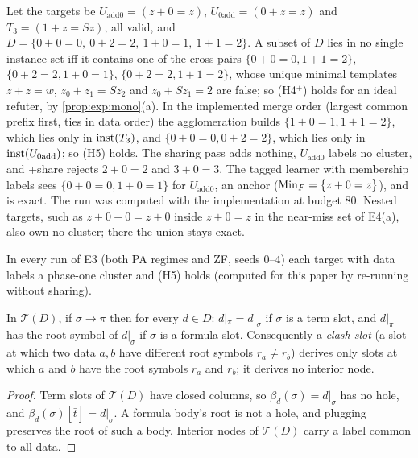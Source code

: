 \begin{example}\label{ex:exp:share}
Let the targets be $U_{\mathrm{add0}}=(z+0=z)$, $U_{\mathrm{0add}}=(0+z=z)$ and $T_3=(1+z=Sz)$, all valid, and $D=\{0+0=0,\ 0+2=2,\ 1+0=1,\ 1+1=2\}$. A subset of $D$ lies in no single instance set iff it contains one of the cross pairs $\{0+0=0,1+1=2\}$, $\{0+2=2,1+0=1\}$, $\{0+2=2,1+1=2\}$, whose unique minimal templates $z+z=w$, $z_0+z_1=Sz_2$ and $z_0+Sz_1=2$ are false; so (H4$^+$) holds for an ideal refuter, by \cref{prop:exp:mono}(a). In the implemented merge order (largest common prefix first, ties in data order) the agglomeration builds $\{1+0=1,1+1=2\}$, which lies only in $\mathrm{inst}(T_3)$, and $\{0+0=0,0+2=2\}$, which lies only in $\mathrm{inst}(U_{\mathrm{0add}})$; so (H5) holds. The sharing pass adds nothing, $U_{\mathrm{add0}}$ labels no cluster, and \DTRC{}+share rejects $2+0=2$ and $3+0=3$. The tagged learner with membership labels sees $\{0+0=0,1+0=1\}$ for $U_{\mathrm{add0}}$, an anchor ($\mathrm{Min}_F=\{z+0=z\}$), and is exact. The run was computed with the implementation at budget $80$. Nested targets, such as $z+0+0=z+0$ inside $z+0=z$ in the near-miss set of E4(a), also own no cluster; there the union stays exact.
\end{example}

In every run of E3 (both PA regimes and ZF, seeds $0$--$4$) each target with data labels a phase-one cluster and (H5) holds (computed for this paper by re-running \DTRC{} without sharing).

\begin{lemma}\label{lem:exp:heads}
In $\mathcal T(D)$, if $\sigma\to\pi$ then for every $d\in D$: $d|_\pi=d|_\sigma$ if $\sigma$ is a term slot, and $d|_\pi$ has the root symbol of $d|_\sigma$ if $\sigma$ is a formula slot. Consequently a \emph{clash slot} (a slot at which two data $a,b$ have different root symbols $r_a\neq r_b$) derives only slots at which $a$ and $b$ have the root symbols $r_a$ and $r_b$; it derives no interior node.
\end{lemma}

\begin{proof}
Term slots of $\mathcal T(D)$ have closed columns, so $\beta_d(\sigma)=d|_\sigma$ has no hole, and $\beta_d(\sigma)[\bar t]=d|_\sigma$. A formula body's root is not a hole, and plugging preserves the root of such a body. Interior nodes of $\mathcal T(D)$ carry a label common to all data.
\end{proof}

